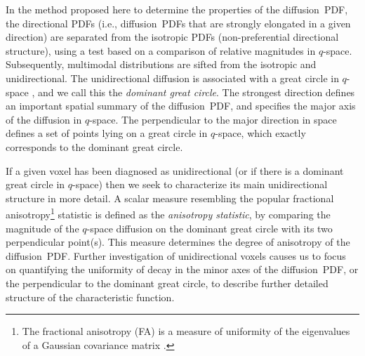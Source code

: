 \documentclass[dvips,aoas,preprint]{imsart}
\numberwithin{equation}{section}
\theoremstyle{plain}
\begin{document}
In the method proposed here to determine the properties of the
diffusion~PDF, the directional PDFs (i.e., diffusion~PDFs that are
strongly elongated in a given direction) are separated from the
isotropic PDFs (non-preferential directional structure), using a test
based on a comparison of relative magnitudes in $q$-space.
Subsequently, multimodal distributions are sifted from the isotropic
and unidirectional.  The unidirectional diffusion is associated with a
great circle in $q$-space \citep{Tuch}, and we call this the {\em
  dominant great circle}.  The strongest direction defines an
important spatial summary of the diffusion~PDF, and specifies the
major axis of the diffusion in $q$-space.  The perpendicular to the
major direction in space defines a set of points lying on a great
circle in $q$-space, which exactly corresponds to the dominant great
circle.

If a given voxel has been diagnosed as unidirectional (or if there is
a dominant great circle in $q$-space) then we seek to characterize its
main unidirectional structure in more detail.  A scalar measure
resembling the popular fractional anisotropy\footnote{The fractional
  anisotropy (FA) is a measure of uniformity of the eigenvalues of a
  Gaussian covariance matrix \citep{bas:FA}.}  statistic is defined as
the {\em anisotropy statistic}, by comparing the magnitude of the
$q$-space diffusion on the dominant great circle with its two
perpendicular point(s).  This measure determines the degree of
anisotropy of the diffusion~PDF.  Further investigation of
unidirectional voxels causes us to focus on quantifying the uniformity
of decay in the minor axes of the diffusion~PDF, or the perpendicular
to the dominant great circle, to describe further detailed structure
of the characteristic function.
\end{document}

